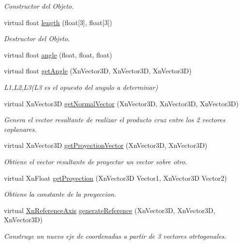 \begin{DoxyCompactItemize}
\begin{DoxyCompactList}\small\item\em Constructor del Objeto. \end{DoxyCompactList}\item 
virtual float \hyperlink{class_joint_a1b4c78e285a1d96bbde889d4979828fa}{length} (float\mbox{[}3\mbox{]}, float\mbox{[}3\mbox{]})
\begin{DoxyCompactList}\small\item\em Destructor del Objeto. \end{DoxyCompactList}\item 
virtual float \hyperlink{class_joint_ab4a853045a69e77e8b67d195be145eed}{angle} (float, float, float)
\item 
virtual float \hyperlink{class_joint_a52f2f6003f4cff059847d959488622a1}{get\-Angle} (Xn\-Vector3\-D, Xn\-Vector3\-D, Xn\-Vector3\-D)
\begin{DoxyCompactList}\small\item\em L1,L2,L3(\-L3 es el opuesto del angulo a determinar) \end{DoxyCompactList}\item 
virtual Xn\-Vector3\-D \hyperlink{class_joint_ac59f570adbaf039bbe0f4173e5e7e2ce}{get\-Normal\-Vector} (Xn\-Vector3\-D, Xn\-Vector3\-D, Xn\-Vector3\-D)
\begin{DoxyCompactList}\small\item\em Genera el vector resultante de realizar el producto cruz entre los 2 vectores coplanares. \end{DoxyCompactList}\item 
virtual Xn\-Vector3\-D \hyperlink{class_joint_af5590ba3d5bfc4e27a43036a1d394629}{get\-Proyection\-Vector} (Xn\-Vector3\-D, Xn\-Vector3\-D)
\begin{DoxyCompactList}\small\item\em Obtiene el vector resultante de proyectar un vector sobre otro. \end{DoxyCompactList}\item 
virtual Xn\-Float \hyperlink{class_joint_a06ed69732a17f61fa6ce9fa5ba2541ea}{get\-Proyection} (Xn\-Vector3\-D Vector1, Xn\-Vector3\-D Vector2)
\begin{DoxyCompactList}\small\item\em Obtiene la constante de la proyeccion. \end{DoxyCompactList}\item 
virtual \hyperlink{struct_xn_reference_axis}{Xn\-Reference\-Axis} \hyperlink{class_joint_a603eab4701f005bc6a39911897eb6c7d}{generate\-Reference} (Xn\-Vector3\-D, Xn\-Vector3\-D, Xn\-Vector3\-D)
\begin{DoxyCompactList}\small\item\em Construye un nuevo eje de coordenadas a partir de 3 vectores otrtogonales. \end{DoxyCompactList}\end{DoxyCompactItemize}


